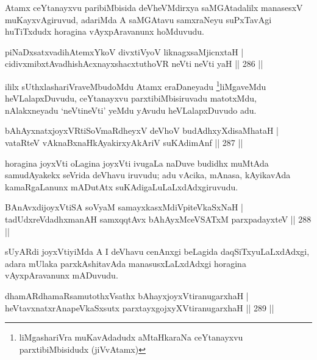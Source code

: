 \begin{artha}
Atamx ceYtanayxvu paribiMbisida deVheVMdirxya saMGAtadalilx manasesxV muKayxvAgiruvud, adariMda A saMGAtavu samxraNeyu suPxTavAgi huTiTxdudx horagina vAyxpAravanunx hoMduvudu.
\end{artha}

\begin{shl}
piNaDxsatxvadihA\s \s temxYkoV divxtiVyoV liknagxsaMjicnxtaH | \\
\footnotemark[2]{}cidivxmibxtAvadhishAcxnayxshacxtuthoVR neVti neVti yaH \hfill ||  286 ||  
\end{shl}

\begin{artha}
ililx sUthxlashariVraveMbudoMdu Atamx eraDaneyadu \footnote[1]{liMgashariVra muKavAdadudx aMtaHkaraNa ceYtanayxvu parxtibiMbisidudx (jiVvAtamx)}liMgaveMdu heVLalapxDuvudu, ceYtanayxvu parxtibiMbisiruvadu matotxMdu, nAlakxneyadu `neVtineVti' yeMdu yAvudu heVLalapxDuvudo adu.
\end{artha}

\begin{shl}
bAhAyxnatxjoyxVRtiSoVmaRdheyxV deVhoV budAdhxyXdisaMhataH | \\
vataRteV vAknaBxnaHkAyakirxyAkAriV suKAdimAnf \hfill ||  287 ||  
\end{shl}

\begin{artha}
horagina joyxVti oLagina joyxVti ivugaLa naDuve budidhx muMtAda samudAyakekx seVrida deVhavu iruvudu; adu vAcika, mAnasa, kAyikavAda kamaRgaLanunx mADutAtx suKAdigaLuLaLxdAdxgiruvudu.
\end{artha}

\begin{shl}
BAnAvxdijoyxVtiSA soV\s yaM samayxkasxMdiVpiteVkaSxNaH | \\
tadUdxreVdadhxmanAH samxqqtAvx bAhAyxMceVSATxM parxpadayxteV \hfill ||  288 ||  
\end{shl}

\begin{artha}
sUyARdi joyxVtiyiMda A I deVhavu cenAnxgi beLagida daqSiTxyuLaLxdAdxgi, adara mUlaka parxkAshitavAda manasusxLaLxdAdxgi horagina vAyxpAravanunx mADuvudu.
\end{artha}

\begin{shl}
dhamARdhamaRsamutothxV\s sathx bAhayxjoyxVtiranugarxhaH | \\
heVtavxnatxrAnapeVkaSxsutx parxtayxgojxyXVtiranugarxhaH \hfill ||   289 ||  
\end{shl}

